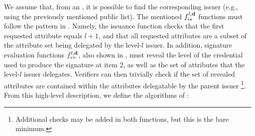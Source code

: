 We assume that, from an \ipk, it is possible to find the corresponding issuer
(e.g., using the previously mentioned public list). The mentioned
$f_{is}^{l,\mathbf{d}}$ functions must follow the pattern in .
Namely, the issuance function checks that the first requested attribute equals
$l+1$, and that all requested attributes are a subset of the attribute set
\dattrs being delegated by the level-$l$ issuer. In addition, signature
evaluation functions $f_{ev}^{l,\mathbf{d}}$, also shown in ,
must reveal the level of the credential used to produce the \UAS signature at
item 2, as well as the set of attributes \dattrs that the level-$l$ issuer
delegates. Verifiers can then trivially check if the set of revealed attributes
are contained within the attributes delegatable by the parent issuer%
\footnote{Additional checks may be added in both functions, but this is
  the bare minimum.}.
%
From this high-level description, we define the algorithms of \CUASDAC:

